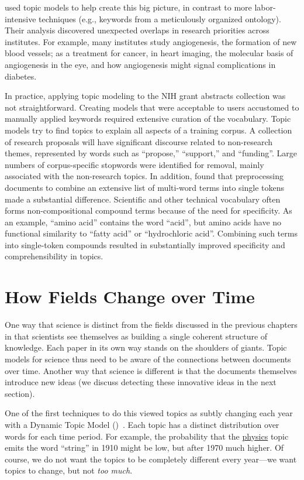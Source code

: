\citet{talley-11} used topic models to help create this big picture,
in contrast to more labor-intensive techniques (e.g., keywords from a
meticulously organized ontology).  Their analysis discovered
unexpected overlaps in research priorities across institutes.  For
example, many institutes study angiogenesis, the formation of new
blood vessels; as a treatment for cancer, in heart imaging, the
molecular basis of angiogenesis in the eye, and how angiogenesis might
signal complications in diabetes.

In practice, applying topic modeling to the NIH grant abstracts collection was not straightforward.
Creating models that were acceptable to users accustomed to manually applied keywords required extensive curation of the vocabulary.
Topic models try to find topics to explain all aspects of a training corpus.
A collection of research proposals will have significant discourse related to non-research themes, represented by words such as ``propose,'' ``support,'' and ``funding''.
Large numbers of corpus-specific stopwords were identified for removal, mainly associated with the non-research topics.
In addition, \citet{talley-11} found that preprocessing documents to combine an extensive list of multi-word terms into single tokens made a substantial difference.
Scientific and other technical vocabulary often forms non-compositional compound terms because of the need for specificity.
As an example, ``amino acid'' contains the word ``acid'', but amino acids have no functional similarity to ``fatty acid'' or ``hydrochloric acid''.
Combining such terms into single-token compounds resulted in substantially improved specificity and comprehensibility in topics.

\section{How Fields Change over Time}
\label{sec:sci_change}

One way that science is distinct from the fields discussed in the
previous chapters in that scientists see themselves as building a single coherent structure of knowledge.  Each
paper in its own way stands on the shoulders of giants. Topic models
for science thus need to be aware of the connections between documents
over time.  Another way that science is different is that the
documents themselves introduce new ideas (we discuss detecting these
innovative ideas in the next section).

One of the first techniques to do this viewed topics as subtly
changing each year with a Dynamic Topic
Model ()~\citep{blei-06b}.  Each topic has a distinct
distribution over words for each time period.  For example, the probability that
the \underline{physics} topic emits the word ``string'' in 1910 might be low,
but after 1970 much higher.  Of course, we do not want the topics to be completely
different every year---we want topics to change, but not \emph{too
  much}.

